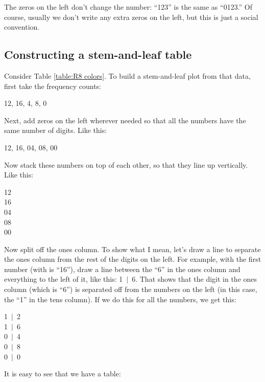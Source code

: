 \documentclass[../../../main.tex]{subfiles}
\begin{document}
The zeros on the left don't change the number: ``123'' is the same as ``0123.'' Of course, usually we don't write any extra zeros on the left, but this is just a social convention.


\subsection{Constructing a stem-and-leaf table}

Consider Table \ref{table:R8 colors}. To build a stem-and-leaf plot from that data, first take the frequency counts:

\begin{center}
  12, 16, 4, 8, 0
\end{center}

Next, add zeros on the left wherever needed so that all the numbers have the same number of digits. Like this:

\begin{center}
  12, 16, 04, 08, 00
\end{center}

Now stack these numbers on top of each other, so that they line up vertically. Like this:

\begin{center}
  12 \\
  16 \\
  04 \\
  08 \\
  00
\end{center}

Now split off the ones column. To show what I mean, let's draw a line to separate the ones column from the rest of the digits on the left. For example, with the first number (with is ``16''), draw a line between the ``6'' in the ones column and everything to the left of it, like this: 1~$|$~6. That shows that the digit in the ones column (which is ``6'') is separated off from the numbers on the left (in this case, the ``1'' in the tens column). If we do this for all the numbers, we get this:

\begin{center}
  1~$|$~2 \\
  1~$|$~6 \\
  0~$|$~4 \\
  0~$|$~8 \\
  0~$|$~0
\end{center}

It is easy to see that we have a table:
\end{document}
